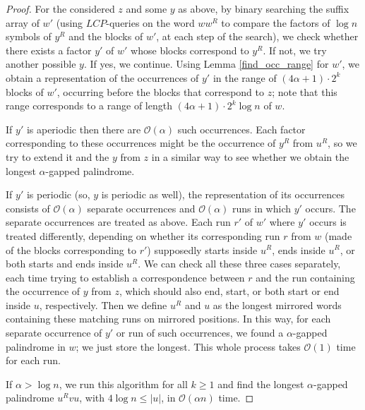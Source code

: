 \documentclass[final]{dmtcs-episciences}
\newcommand{\bigo}{{\mathcal O}}
\newcommand{\LCP}{{\mathit{LCP}}}
\begin{document}
\begin{proof}
For the considered $z$ and some $y$ as above, by binary searching the suffix array of $w'$ (using $\LCP$-queries on the word $ww^R$ to compare the factors of $\log n$ symbols of $y^R$ and the blocks of $w'$, at each step of the search), we check whether there exists a factor $y'$ of $w'$ whose blocks correspond to $y^R$. If not, we try another possible $y$. If yes, we continue. Using Lemma \ref{find_occ_range} for $w'$, we obtain a representation of the occurrences of $y'$ in the range of $(4\alpha+1)\cdot 2^k$ blocks of $w'$, occurring before the blocks that correspond to $z$; note that this range corresponds to a range of length $(4\alpha+1)\cdot 2^k \log n$ of $w$. 

If $y'$ is aperiodic then there are $\bigo(\alpha)$ such occurrences. Each factor corresponding to these occurrences might be the occurrence of $y^R$ from $u^R$, so we try to extend it and the $y$ from $z$ in a similar way to see whether we obtain the longest $\alpha$-gapped palindrome. 

If $y'$ is periodic (so, $y$ is periodic as well), the representation of its occurrences consists of $\bigo(\alpha)$ separate occurrences and $\bigo(\alpha)$ runs in which $y'$ occurs. The separate occurrences are treated as above. Each run $r'$ of $w'$ where $y'$ occurs is treated differently, depending on whether its corresponding run $r$ from $w$ (made of the blocks corresponding to $r'$) supposedly starts inside $u^R$, ends inside $u^R$, or both starts and ends inside $u^R$. We can check all these three cases separately, each time trying to establish a correspondence between $r$ and the run containing the occurrence of $y$ from $z$, which should also end, start, or both start or end inside $u$, respectively. Then we define $u^R$ and $u$ as the longest mirrored words containing these matching runs on mirrored positions. In this way, for each separate occurrence of $y'$ or run of such occurrences, we found a $\alpha$-gapped palindrome in $w$; we just store the longest. This whole process takes $\bigo(1)$ time for each run.

If $\alpha > \log n$, we run this algorithm for all $k\geq 1$ and find the longest $\alpha$-gapped palindrome $u^Rvu$, with $4\log n \leq |u|$, in $\bigo(\alpha n)$ time. 


\end{proof}
\end{document}
